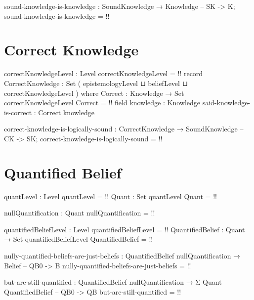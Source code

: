 \documentclass{article}
\begin{document}
\begin{code}
sound-knowledge-is-knowledge : SoundKnowledge → Knowledge -- SK -> K;
sound-knowledge-is-knowledge = {!!}
\end{code}

\section{Correct Knowledge}

\begin{code}
correctKnowledgeLevel : Level
correctKnowledgeLevel = {!!}
record CorrectKnowledge : Set ( epistemologyLevel
                              ⊔ beliefLevel
                              ⊔ correctKnowledgeLevel
                              ) where
  Correct : Knowledge → Set correctKnowledgeLevel
  Correct = {!!}
  field
    knowledge : Knowledge
    said-knowledge-is-correct : Correct knowledge
\end{code}

\begin{code}
correct-knowledge-is-logically-sound :
  CorrectKnowledge → SoundKnowledge -- CK -> SK;
correct-knowledge-is-logically-sound = {!!}
\end{code}

\section{Quantified Belief}

\begin{code}
quantLevel : Level
quantLevel = {!!}
Quant : Set quantLevel
Quant = {!!}
\end{code}

\begin{code}
nullQuantification : Quant
nullQuantification = {!!}
\end{code}

\begin{code}
quantifiedBeliefLevel : Level
quantifiedBeliefLevel = {!!}
QuantifiedBelief : Quant → Set quantifiedBeliefLevel
QuantifiedBelief = {!!}
\end{code}

\begin{code}
nully-quantified-beliefs-are-just-beliefs :
  QuantifiedBelief nullQuantification → Belief -- QB0 -> B
nully-quantified-beliefs-are-just-beliefs = {!!}
\end{code}

\begin{code}
but-are-still-quantified :
  QuantifiedBelief nullQuantification →
  Σ Quant QuantifiedBelief -- QB0 -> QB
but-are-still-quantified = {!!}
\end{code}
\end{document}
